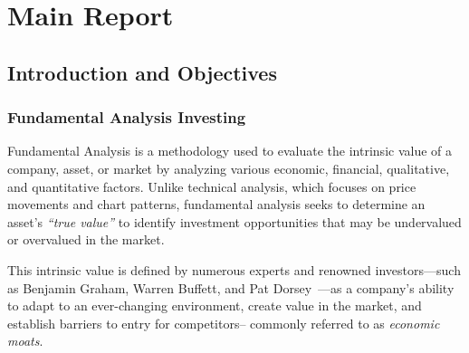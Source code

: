 \documentclass[11pt,english,a4paper,hidelinks]{book}
\begin{document}
\tableofcontents
\newpage

\listoffigures
\newpage

\listoftables


\printglossary[type=\acronymtype, title=Acronyms and Abreviations]

\clearpage
{}
\setcounter{page}{1}

\part{Main Report}

\chapter{Introduction and Objectives }
\section{Fundamental Analysis Investing}

\noindent Fundamental Analysis is a methodology used to evaluate the intrinsic value of a company, asset, or market by analyzing various economic, financial, qualitative, and quantitative factors. Unlike technical analysis, which focuses on price movements and chart patterns, fundamental analysis seeks to determine an asset's \textit{``true value''} to identify investment opportunities that may be undervalued or overvalued in the market.

\vspace{0.5cm}
\noindent This intrinsic value is defined by numerous experts and renowned investors—such as Benjamin Graham, Warren Buffett, and Pat Dorsey~\cite{dorsey2011five}—as a company's ability to adapt to an ever-changing environment, create value in the market, and establish barriers to entry for competitors-- commonly referred to as \textit{economic moats}.
\end{document}
